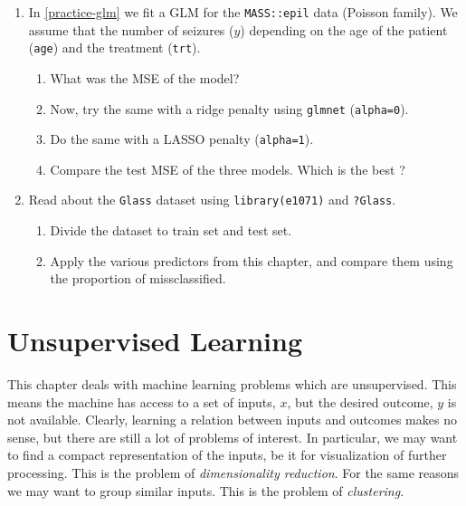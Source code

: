 \documentclass[]{book}
\providecommand{\tightlist}{%
  \setlength{\itemsep}{0pt}\setlength{\parskip}{0pt}}
\theoremstyle{definition}
\theoremstyle{definition}
\theoremstyle{definition}
\theoremstyle{remark}
\begin{document}
\begin{enumerate}
\def\labelenumi{\arabic{enumi}.}
\tightlist
\item
  In \ref{practice-glm} we fit a GLM for the \texttt{MASS::epil} data
  (Poisson family). We assume that the number of seizures (\(y\))
  depending on the age of the patient (\texttt{age}) and the treatment
  (\texttt{trt}).

  \begin{enumerate}
  \def\labelenumii{\arabic{enumii}.}
  \tightlist
  \item
    What was the MSE of the model?
  \item
    Now, try the same with a ridge penalty using \texttt{glmnet}
    (\texttt{alpha=0}).
  \item
    Do the same with a LASSO penalty (\texttt{alpha=1}).
  \item
    Compare the test MSE of the three models. Which is the best ?
  \end{enumerate}
\item
  Read about the \texttt{Glass} dataset using \texttt{library(e1071)}
  and \texttt{?Glass}.

  \begin{enumerate}
  \def\labelenumii{\arabic{enumii}.}
  \tightlist
  \item
    Divide the dataset to train set and test set.
  \item
    Apply the various predictors from this chapter, and compare them
    using the proportion of missclassified.
  \end{enumerate}
\end{enumerate}

\chapter{Unsupervised Learning}\label{unsupervised}

This chapter deals with machine learning problems which are
unsupervised. This means the machine has access to a set of inputs,
\(x\), but the desired outcome, \(y\) is not available. Clearly,
learning a relation between inputs and outcomes makes no sense, but
there are still a lot of problems of interest. In particular, we may
want to find a compact representation of the inputs, be it for
visualization of further processing. This is the problem of
\emph{dimensionality reduction}. For the same reasons we may want to
group similar inputs. This is the problem of \emph{clustering}.
\end{document}
